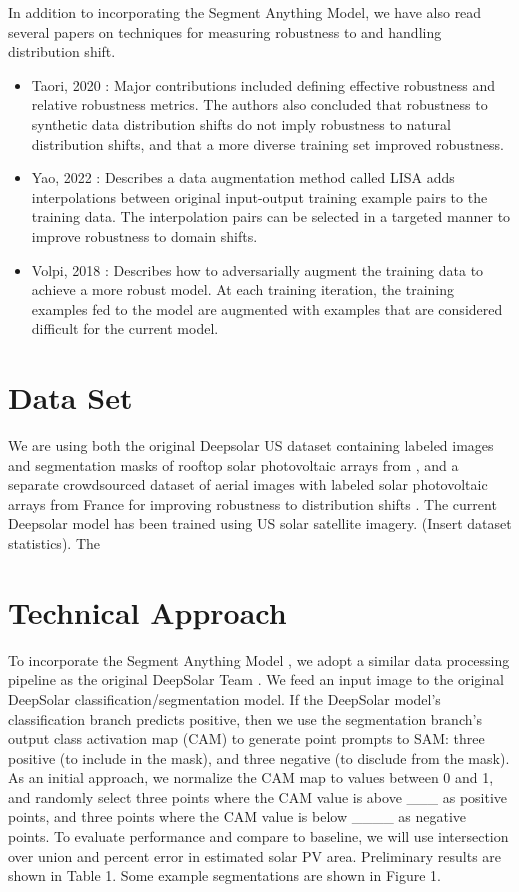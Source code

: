 \documentclass[10pt,twocolumn,letterpaper]{article}
\begin{document}
In addition to incorporating the Segment Anything Model, we have also read several papers on techniques for measuring robustness to and handling distribution shift. 

\begin{itemize}
    \item Taori, 2020 \cite{Taori2020}: Major contributions included defining effective robustness and relative robustness metrics. The authors also concluded that robustness to synthetic data distribution shifts do not imply robustness to natural distribution shifts, and that a more diverse training set improved robustness.
    \item Yao, 2022 \cite{yao2022improving}: Describes a data augmentation method called LISA adds interpolations between original input-output training example pairs to the training data. The interpolation pairs can be selected in a targeted manner to improve robustness to domain shifts.
    \item Volpi, 2018 \cite{volpi2018generalizing}: Describes how to adversarially augment the training data to achieve a more robust model. At each training iteration, the training examples fed to the model are augmented with examples that are considered difficult for the current model.
\end{itemize}

\section{Data Set}

We are using both the original Deepsolar US dataset containing labeled images and segmentation masks of rooftop solar photovoltaic arrays from \cite{DeepSolar1}, and a separate crowdsourced dataset of aerial images with labeled solar photovoltaic arrays from France for improving robustness to distribution shifts \cite{Kasmi2023}.  The current Deepsolar model has been trained using US solar satellite imagery. (Insert dataset statistics). The 

\section{Technical Approach}

To incorporate the Segment Anything Model \cite{kirillov2023segment}, we adopt a similar data processing pipeline as the original DeepSolar Team \cite{DeepSolar1}. We feed an input image to the original DeepSolar classification/segmentation model. If the DeepSolar model's classification branch predicts positive, then we use the segmentation branch's output class activation map (CAM) to generate point prompts to SAM: three positive (to include in the mask), and three negative (to disclude from the mask). As an initial approach, we normalize the CAM map to values between 0 and 1, and randomly select three points where the CAM value is above ___ as positive points, and three points where the CAM value is below ____ as negative points. To evaluate performance and compare to baseline, we will use intersection over union and percent error in estimated solar PV area. Preliminary results are shown in Table 1. Some example segmentations are shown in Figure 1.
\end{document}
